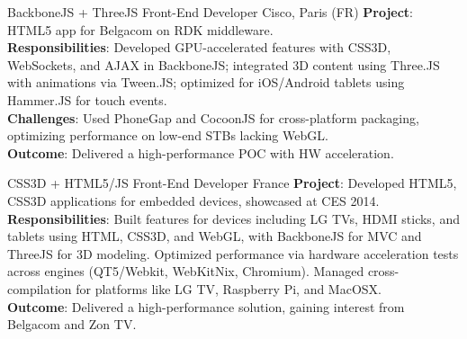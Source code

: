 \documentclass[
  a4paper,
   maincolor=cvblue,
   sectioncolor=cvblue,
]{fortysecondscv}
\begin{document}
\newpage
\makethirdsidebar


\begin{cvtable}
    {BackboneJS + ThreeJS Front-End Developer}
    {Cisco, Paris (FR)}
    {
      \textbf{Project}: HTML5 app for Belgacom on RDK middleware.\\
      \textbf{Responsibilities}: Developed GPU-accelerated features with CSS3D, WebSockets, and AJAX in BackboneJS; integrated 3D content using Three.JS with animations via Tween.JS; optimized for iOS/Android tablets using Hammer.JS for touch events.\\
      \textbf{Challenges}: Used PhoneGap and CocoonJS for cross-platform packaging, optimizing performance on low-end STBs lacking WebGL.\\
      \textbf{Outcome}: Delivered a high-performance POC with HW acceleration.\\
    }
\end{cvtable}



\begin{cvtable}
    {CSS3D + HTML5/JS Front-End Developer}
    {France}
    {
      \textbf{Project}: Developed HTML5, CSS3D applications for embedded devices, showcased at CES 2014.\\
      \textbf{Responsibilities}:
          Built features for devices including LG TVs, HDMI sticks, and tablets using HTML, CSS3D, and WebGL, with BackboneJS for MVC and ThreeJS for 3D modeling.
          Optimized performance via hardware acceleration tests across engines (QT5/Webkit, WebKitNix, Chromium). Managed cross-compilation for platforms like LG TV, Raspberry Pi, and MacOSX.\\
      \textbf{Outcome}: Delivered a high-performance solution, gaining interest from Belgacom and Zon TV.\\
    }
\end{cvtable}
\end{document}
